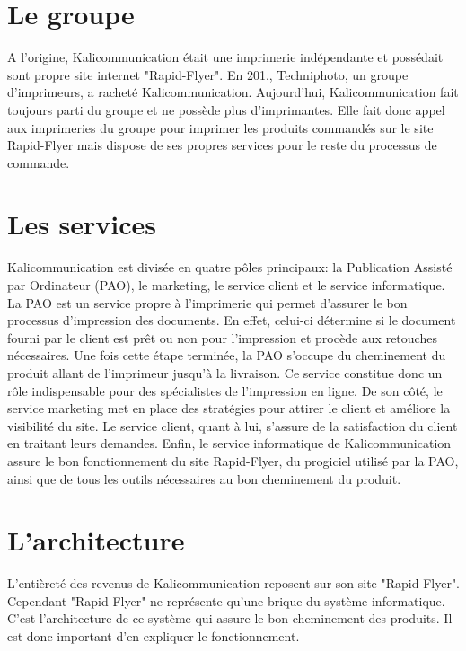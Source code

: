 
\section{Le groupe}
A l'origine, Kalicommunication était une imprimerie indépendante et possédait sont propre site internet "Rapid-Flyer".\newline
En 201., Techniphoto, un groupe d'imprimeurs, a racheté Kalicommunication. Aujourd'hui, Kalicommunication fait toujours parti du groupe et ne possède plus d'imprimantes. Elle fait donc appel aux imprimeries du groupe pour imprimer les produits commandés sur le site Rapid-Flyer mais dispose de ses propres services pour le reste du processus de commande.

\section{Les services}
Kalicommunication est divisée en quatre pôles principaux: la Publication Assisté par Ordinateur (PAO), le marketing, le service client et le service informatique.\newline
La PAO est un service propre à l'imprimerie qui permet d'assurer le bon processus d'impression des documents. En effet, celui-ci détermine si le document fourni par le client est prêt ou non pour l'impression et procède aux retouches nécessaires. Une fois cette étape terminée, la PAO s'occupe du cheminement du produit allant de l'imprimeur jusqu'à la livraison. Ce service constitue donc un rôle indispensable pour des spécialistes de l'impression en ligne.\newline
De son côté, le service marketing met en place des stratégies pour attirer le client et améliore la visibilité du site.
Le service client, quant à lui, s'assure de la satisfaction du client en traitant leurs demandes.\newline
Enfin, le service informatique de Kalicommunication assure le bon fonctionnement du site Rapid-Flyer, du progiciel utilisé par la PAO, ainsi que de tous les outils nécessaires au bon cheminement du produit.

\section{L'architecture}
L'entièreté des revenus de Kalicommunication reposent sur son site "Rapid-Flyer". Cependant "Rapid-Flyer" ne représente qu'une brique du système informatique. C'est l'architecture de ce système qui assure le bon cheminement des produits. Il est donc important d'en expliquer le fonctionnement.

